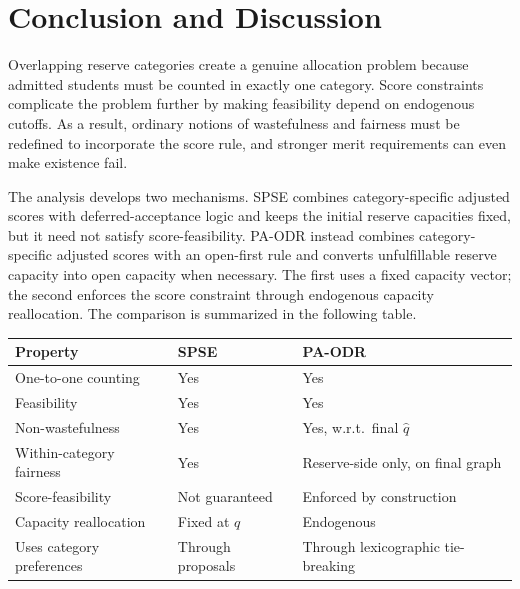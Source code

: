 \documentclass[runningheads]{llncs}
\newcommand{\1}{\mathbf{1}}
\begin{document}


\section{Conclusion and Discussion}
Overlapping reserve categories create a genuine allocation problem because admitted students must be counted in exactly one category. Score constraints complicate the problem further by making feasibility depend on endogenous cutoffs. As a result, ordinary notions of wastefulness and fairness must be redefined to incorporate the score rule, and stronger merit requirements can even make existence fail.

The analysis develops two mechanisms. SPSE combines category-specific adjusted scores with deferred-acceptance logic and keeps the initial reserve capacities fixed, but it need not satisfy score-feasibility. PA-ODR instead combines category-specific adjusted scores with an open-first rule and converts unfulfillable reserve capacity into open capacity when necessary. The first uses a fixed capacity vector; the second enforces the score constraint through endogenous capacity reallocation. The comparison is summarized in the following table.

\begin{center}
\renewcommand{\arraystretch}{1.3}
\begin{tabular}{lll}
\toprule
\textbf{Property} & \textbf{SPSE} & \textbf{PA-ODR} \\
\midrule
One-to-one counting & Yes & Yes \\
Feasibility & Yes & Yes \\
Non-wastefulness & Yes & Yes, w.r.t.\ final $\hat q$ \\
Within-category fairness & Yes & Reserve-side only, on final graph \\
Score-feasibility & Not guaranteed & Enforced by construction \\
Capacity reallocation & Fixed at $q$ & Endogenous \\
Uses category preferences & Through proposals & Through lexicographic tie-breaking \\
\bottomrule
\end{tabular}
\end{center}
\end{document}
